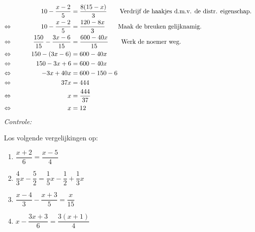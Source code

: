 \documentclass{bis}
\begin{document}
\begin{voorbeeld}
\begin{alignat*}{2}
     && 10 - \dfrac{x-2}{5} &= \dfrac{8(15-x)}{3} \qquad\text{Verdrijf de haakjes d.m.v. de distr. eigenschap.}\\
\Leftrightarrow\mkern40mu && 10 - \dfrac{x-2}{5} &= \dfrac{120-8x}{3} \qquad\text{Maak de breuken gelijknamig.}\\
\Leftrightarrow\mkern40mu && \dfrac{150}{15} - \dfrac{3x-6}{15} &= \dfrac{600-40x}{15}	\qquad\text{Werk de noemer weg.}\\
\Leftrightarrow\mkern40mu && 150 - (3x -6) &= 600 - 40x\\
\Leftrightarrow\mkern40mu && 150 - 3x + 6	&= 600 - 40x\\
\Leftrightarrow\mkern40mu && - 3x + 40x	&= 600 - 150 - 6\\
\Leftrightarrow\mkern40mu && 37x	&= 444\\
\Leftrightarrow\mkern40mu && x	&= \dfrac{444}{37}\\
\Leftrightarrow\mkern40mu && x	&= 12
\end{alignat*}
{\em Controle: }\\
\end{voorbeeld}

\begin{exercise}
Los volgende vergelijkingen op:
\begin{enumerate}
  \item $\dfrac{x+2}{6}=\dfrac{x-5}{4}$
  \item $\dfrac{4}{3}x-\dfrac{5}{2}=\dfrac{1}{5}x-\dfrac{1}{2}+\dfrac{1}{3}x$
  \item $\dfrac{x-4}{3}-\dfrac{x+3}{5}=\dfrac{x}{15}$
  \item $x-\dfrac{3x+3}{6}=\dfrac{3(x+1)}{4}$
\end{enumerate}
\end{exercise}
\end{document}
